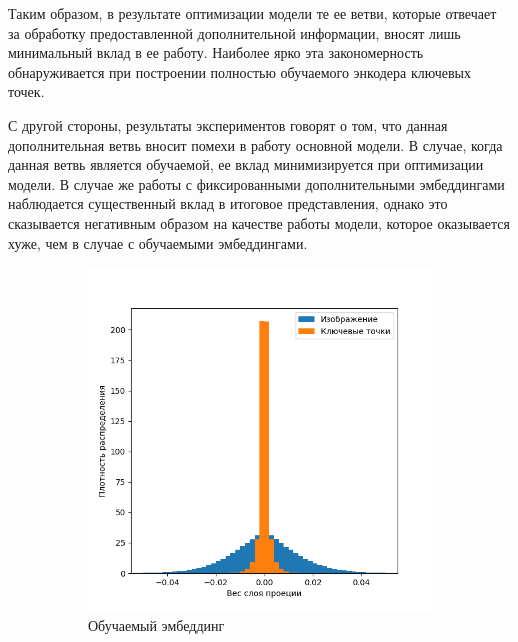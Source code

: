 Таким образом, в результате оптимизации модели те ее ветви, которые отвечает за обработку предоставленной дополнительной информации, вносят лишь минимальный вклад в ее работу. Наиболее ярко эта закономерность обнаруживается при построении полностью обучаемого энкодера ключевых точек.

С другой стороны, результаты экспериментов говорят о том, что данная дополнительная ветвь вносит помехи в работу основной модели. В случае, когда данная ветвь является обучаемой, ее вклад минимизируется при оптимизации модели. В случае же работы с фиксированными дополнительными эмбеддингами наблюдается существенный вклад в итоговое представления, однако это сказывается негативным образом на качестве работы модели, которое оказывается хуже, чем в случае с обучаемыми эмбеддингами.

\begin{figure}[ht]
	\centering
	\begin{subfigure}[b]{0.45\textwidth}
		\includegraphics{images/results/analyze_model/concat_normalize.png}
		\caption{Обучаемый эмбеддинг}
		\label{fig:proj_weights_learn}
	\end{subfigure}
	\begin{subfigure}[b]{0.45\textwidth}

\end{subfigure}
\end{figure}
